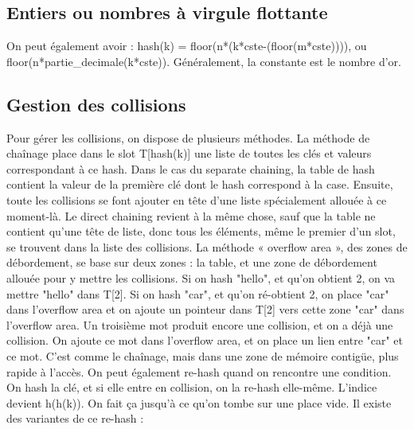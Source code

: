 \documentclass[10pt]{article}
\begin{document}
\subsection{Entiers ou nombres à virgule flottante}
On peut également avoir : 
\newline \newline 
\indent hash(k) = floor(n*(k*cste-(floor(m*cste)))), ou floor(n*partie\_decimale(k*cste)). 
\newline \newline 
Généralement, la constante est le nombre d'or.
\subsection{Gestion des collisions}
Pour gérer les collisions, on dispose de plusieurs méthodes. 
\newline \newline 
La méthode de chaînage place dans le slot T[hash(k)] une liste de toutes les clés et valeurs correspondant à ce hash. Dans le cas du separate chaining, la table de hash contient la valeur de la première clé dont le hash correspond à la case. Ensuite, toute les collisions se font ajouter en tête d'une liste spécialement allouée à ce moment-là. Le direct chaining revient à la même chose, sauf que la table ne contient qu'une tête de liste, donc tous les éléments, même le premier d'un slot, se trouvent dans la liste des collisions. 
\newline \newline 
La méthode « overflow area », des zones de débordement, se base sur deux zones : la table, et une zone de débordement allouée pour y mettre les collisions. Si on hash "hello", et qu'on obtient 2, on va mettre "hello" dans T[2]. Si on hash "car", et qu'on ré-obtient 2, on place "car" dans l'overflow area et on ajoute un pointeur dans T[2] vers cette zone "car" dans l'overflow area. Un troisième mot produit encore une collision, et on a déjà une collision. On ajoute ce mot dans l'overflow area, et on place un lien entre "car" et ce mot. C'est comme le chaînage, mais dans une zone de mémoire contigüe, plus rapide à l'accès.  
\newline \newline 
On peut également re-hash quand on rencontre une condition. On hash la clé, et si elle entre en collision, on la re-hash elle-même. L'indice devient h(h(k)). On fait ça jusqu'à ce qu'on tombe sur une place vide. Il existe des variantes de ce re-hash :
\end{document}
